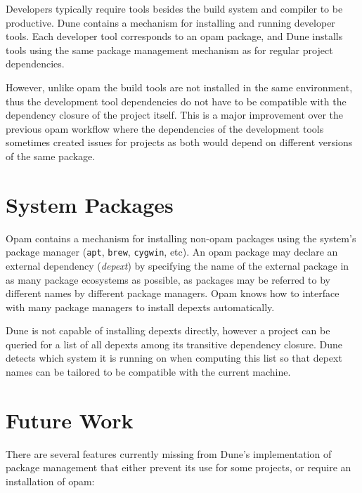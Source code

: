 \documentclass{article}
\begin{document}
\begin{multicols}{2}
        Developers typically require tools besides the build system and compiler
        to be productive. Dune contains a mechanism for installing and running
        developer tools. Each developer tool corresponds to an opam package, and
        Dune installs tools using the same package management mechanism as for
        regular project dependencies.

        However, unlike opam the build tools are not installed in the same
        environment, thus the development tool dependencies do not have to be
        compatible with the dependency closure of the project itself. This is a
        major improvement over the previous opam workflow where the
        dependencies of the development tools sometimes created issues for
        projects as both would depend on different versions of the same
        package.

        \section {System Packages}

        Opam contains a mechanism for installing non-opam packages using the
        system's package manager (\texttt{apt}, \texttt{brew}, \texttt{cygwin},
        etc). An opam package may declare an external dependency
        (\textit{depext}) by specifying the name of the external package in as
        many package ecosystems as possible, as packages may be referred to by
        different names by different package managers. Opam knows how to
        interface with many package managers to install depexts automatically.

        Dune is not capable of installing depexts directly, however a project
        can be queried for a list of all depexts among its transitive dependency
        closure. Dune detects which system it is running on when computing
        this list so that depext names can be tailored to be compatible with
        the current machine.

        \section {Future Work}

        There are several features currently missing from Dune's implementation
        of package management that either prevent its use for some projects, or
        require an installation of opam:


\end{multicols}
\end{document}
